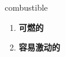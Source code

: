 
\begin{frame}
{\huge combustible}
\begin{center}
\begin{enumerate}\Large
  \item \textbf{可燃的}
  \item \textbf{容易激动的}
\end{enumerate}
\end{center}
\end{frame}
